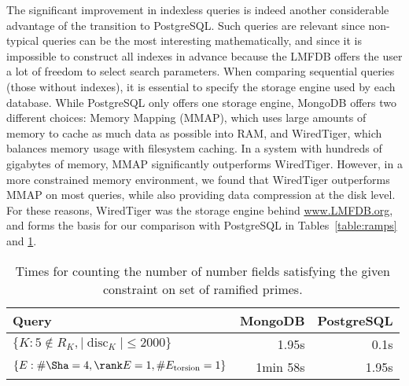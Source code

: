 \documentclass{article}
\begin{document}
The significant improvement in indexless queries is indeed another considerable advantage of the transition to PostgreSQL.
Such queries are relevant since non-typical queries can be the most interesting mathematically, and since it is impossible to construct all indexes in advance because the LMFDB offers the user a lot of freedom to select search parameters.
When comparing sequential queries (those without indexes), it is essential to specify the storage engine used by each database.
While PostgreSQL only offers one storage engine, MongoDB offers two different choices: Memory Mapping (MMAP), which uses large amounts of memory to cache as much data as possible into RAM, and WiredTiger, which balances memory usage with filesystem caching.
In a system with hundreds of gigabytes of memory, MMAP significantly outperforms WiredTiger.
However, in a more constrained memory environment, we found that WiredTiger outperforms MMAP on most queries, while also providing data compression at the disk level.
For these reasons, WiredTiger was the storage engine behind \url{www.LMFDB.org}, and forms the basis for our comparison with PostgreSQL in Tables~\ref{table:ramps} and \ref{table:indexless}.

\begin{table}[h!]
  \begin{center}
  \begin{tabular}{l|r|r}
Query & MongoDB & PostgreSQL\\
\hline
$\{K : 5 \notin R_K, |\operatorname{disc}_K| \leq 2000\}$ & 1.95s & 0.1s\\
$\{E : \# \Sha = 4, \rank E = 1, \# E_{\text{torsion}} = 1\}$ & 1min 58s & 1.95s\\
\end{tabular}
\caption{Times for counting the number of number fields satisfying the given constraint on set of ramified primes.}
\label{table:indexless}
\end{center}
\end{table}
\end{document}
